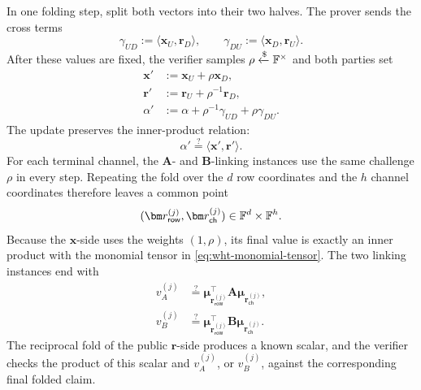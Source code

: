 \documentclass[runningheads]{llncs}
\begin{document}
In one folding step, split both vectors into their two halves.  The
prover sends the cross terms
\[
    \gamma_{UD}:=\langle\bm x_U,\bm r_D\rangle,
    \qquad
    \gamma_{DU}:=\langle\bm x_D,\bm r_U\rangle.
\]
After these values are fixed, the verifier samples
\(\rho\mathrel{\xleftarrow{\$}}{\mathbb{F}}^\times\) and both parties set
\begin{equation}
\begin{aligned}
    \bm x'
      &:=\bm x_U+\rho\bm x_D,\\
    \bm r'
      &:=\bm r_U+\rho^{-1}\bm r_D,\\
    \alpha'
      &:=\alpha
        +\rho^{-1}\gamma_{UD}
        +\rho\gamma_{DU}.
\end{aligned}
\label{eq:wht-link-fold}
\end{equation}
The update preserves the inner-product relation:
\[
    \alpha'\stackrel{?}{=}\langle\bm x',\bm r'\rangle.
\]
For each terminal channel, the \(\bm A\)- and \(\bm B\)-linking
instances use the same challenge \(\rho\) in every step.  Repeating the
fold over the \(d\) row coordinates and the \(h\) channel coordinates
therefore leaves a common point
\[
    (\bm r_{\mathsf{row}}^{(j)},
      \bm r_{\mathsf{ch}}^{(j)})
      \in\Field^d\times\Field^h.
\]
Because the \(\bm x\)-side uses the weights \((1,\rho)\), its
final value is exactly an inner product with the monomial tensor in
\eqref{eq:wht-monomial-tensor}.  The two linking instances end with
\begin{equation}
\begin{aligned}
    v_A^{(j)}
      &\stackrel{?}{=}
      \bm\mu_{\bm r_{\mathsf{row}}^{(j)}}^\top
      \bm A
      \bm\mu_{\bm r_{\mathsf{ch}}^{(j)}},\\
    v_B^{(j)}
      &\stackrel{?}{=}
      \bm\mu_{\bm r_{\mathsf{row}}^{(j)}}^\top
      \bm B
      \bm\mu_{\bm r_{\mathsf{ch}}^{(j)}}.
\end{aligned}
\label{eq:wht-terminal-ab-mle-claims}
\end{equation}
The reciprocal fold of the public \(\bm r\)-side produces a known
scalar, and the verifier checks the product of this scalar and
\(v_A^{(j)}\), or \(v_B^{(j)}\), against the corresponding final folded
claim.
\end{document}
